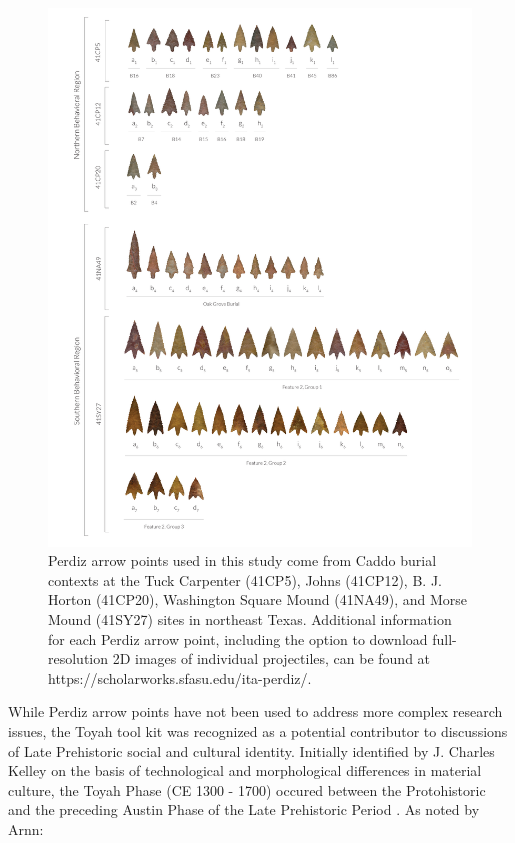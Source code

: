 \documentclass[smallextended]{svjour3}       %
\begin{document}
\begin{figure}
\includegraphics[width=1\linewidth]{ms-figs/figure0} \caption{Perdiz arrow points used in this study come from Caddo burial contexts at the Tuck Carpenter (41CP5), Johns (41CP12), B. J. Horton (41CP20), Washington Square Mound (41NA49), and Morse Mound (41SY27) sites in northeast Texas. Additional information for each Perdiz arrow point, including the option to download full-resolution 2D images of individual projectiles, can be found at https://scholarworks.sfasu.edu/ita-perdiz/.}\label{fig:fig0}
\end{figure}

While Perdiz arrow points have not been used to address more complex
research issues, the Toyah tool kit was recognized as a potential
contributor to discussions of Late Prehistoric social and cultural
identity. Initially identified by J. Charles Kelley on the basis of
technological and morphological differences in material culture, the
Toyah Phase (CE 1300 - 1700) occured between the Protohistoric and the
preceding Austin Phase of the Late Prehistoric Period
\cite{RN9719,RN9720}. As noted by Arnn:
\end{document}
